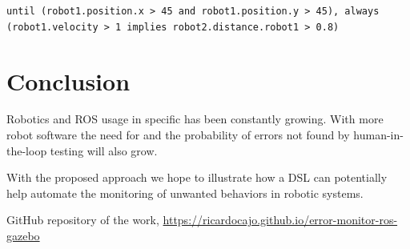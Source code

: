 \documentclass[runningheads]{llncs}
\begin{document}
\texttt{until (robot1.position.x > 45 and robot1.position.y > 45), always (robot1.velocity > 1 implies robot2.distance.robot1 > 0.8)}


\section{Conclusion}

Robotics and ROS usage in specific has been constantly growing. With more robot software the need for and the probability of errors not found by human-in-the-loop testing will also grow.

With the proposed approach we hope to illustrate how a DSL can potentially help automate the monitoring of unwanted behaviors in robotic systems.


\begin{thebibliography}{8}




GitHub repository of the work, \url{https://ricardocajo.github.io/error-monitor-ros-gazebo}
\end{thebibliography}
\end{document}
